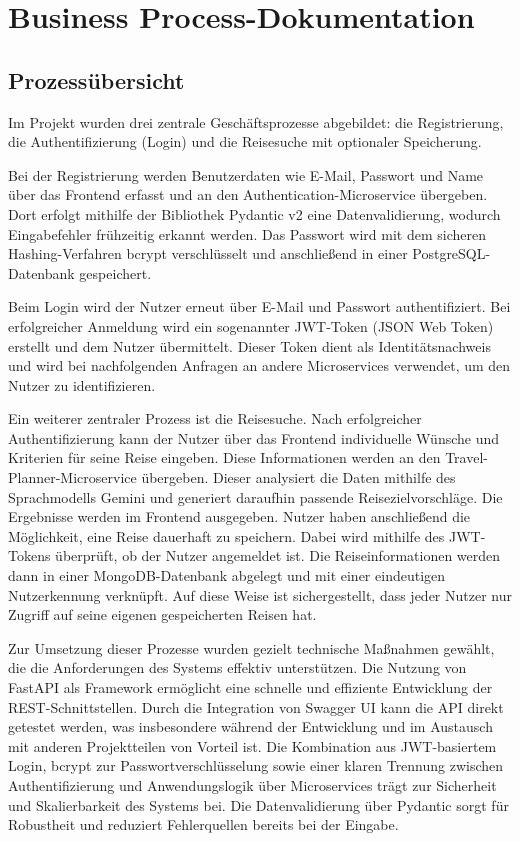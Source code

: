 \section{Business Process-Dokumentation}

\subsection{Prozessübersicht}

Im Projekt wurden drei zentrale Geschäftsprozesse abgebildet: die Registrierung, die Authentifizierung (Login) und die Reisesuche mit optionaler Speicherung.

Bei der Registrierung werden Benutzerdaten wie E-Mail, Passwort und Name über das Frontend erfasst und an den Authentication-Microservice übergeben. Dort erfolgt mithilfe der Bibliothek Pydantic v2 eine Datenvalidierung, wodurch Eingabefehler frühzeitig erkannt werden. Das Passwort wird mit dem sicheren Hashing-Verfahren bcrypt verschlüsselt und anschließend in einer PostgreSQL-Datenbank gespeichert.

Beim Login wird der Nutzer erneut über E-Mail und Passwort authentifiziert. Bei erfolgreicher Anmeldung wird ein sogenannter JWT-Token (JSON Web Token) erstellt und dem Nutzer übermittelt. Dieser Token dient als Identitätsnachweis und wird bei nachfolgenden Anfragen an andere Microservices verwendet, um den Nutzer zu identifizieren.

Ein weiterer zentraler Prozess ist die Reisesuche. Nach erfolgreicher Authentifizierung kann der Nutzer über das Frontend individuelle Wünsche und Kriterien für seine Reise eingeben. Diese Informationen werden an den Travel-Planner-Microservice übergeben. Dieser analysiert die Daten mithilfe des Sprachmodells Gemini und generiert daraufhin passende Reisezielvorschläge. Die Ergebnisse werden im Frontend ausgegeben. Nutzer haben anschließend die Möglichkeit, eine Reise dauerhaft zu speichern. Dabei wird mithilfe des JWT-Tokens überprüft, ob der Nutzer angemeldet ist. Die Reiseinformationen werden dann in einer MongoDB-Datenbank abgelegt und mit einer eindeutigen Nutzerkennung verknüpft. Auf diese Weise ist sichergestellt, dass jeder Nutzer nur Zugriff auf seine eigenen gespeicherten Reisen hat.

Zur Umsetzung dieser Prozesse wurden gezielt technische Maßnahmen gewählt, die die Anforderungen des Systems effektiv unterstützen. Die Nutzung von FastAPI als Framework ermöglicht eine schnelle und effiziente Entwicklung der REST-Schnittstellen. Durch die Integration von Swagger UI kann die API direkt getestet werden, was insbesondere während der Entwicklung und im Austausch mit anderen Projektteilen von Vorteil ist. Die Kombination aus JWT-basiertem Login, bcrypt zur Passwortverschlüsselung sowie einer klaren Trennung zwischen Authentifizierung und Anwendungslogik über Microservices trägt zur Sicherheit und Skalierbarkeit des Systems bei. Die Datenvalidierung über Pydantic sorgt für Robustheit und reduziert Fehlerquellen bereits bei der Eingabe.

